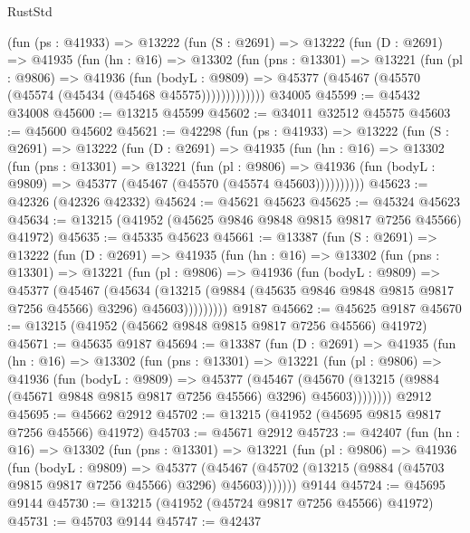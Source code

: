 \begin{lexlean}{RustStd}
\begin{coremodule}
      (fun (ps : @41933) =>
      @13222
        (fun (S : @2691) =>
        @13222
          (fun (D : @2691) =>
          @41935
            (fun (hn : @16) =>
            @13302
              (fun (pns : @13301) =>
              @13221
                (fun (pl : @9806) =>
                @41936
                  (fun (bodyL : @9809) =>
                  @45377 (@45467 (@45570 (@45574 (@45434 (@45468 @45575)))))))))))))
    @34005
@45599 := @45432 @34008
@45600 := @13215 @45599
@45602 := @34011 @32512 @45575
@45603 := @45600 @45602
@45621 := @42298
    (fun (ps : @41933) =>
    @13222
      (fun (S : @2691) =>
      @13222
        (fun (D : @2691) =>
        @41935
          (fun (hn : @16) =>
          @13302
            (fun (pns : @13301) =>
            @13221
              (fun (pl : @9806) =>
              @41936 (fun (bodyL : @9809) => @45377 (@45467 (@45570 (@45574 @45603))))))))))
@45623 := @42326 (@42326 @42332)
@45624 := @45621 @45623
@45625 := @45324 @45623
@45634 := @13215 (@41952 (@45625 @9846 @9848 @9815 @9817 @7256 @45566) @41972)
@45635 := @45335 @45623
@45661 := @13387
    (fun (S : @2691) =>
    @13222
      (fun (D : @2691) =>
      @41935
        (fun (hn : @16) =>
        @13302
          (fun (pns : @13301) =>
          @13221
            (fun (pl : @9806) =>
            @41936
              (fun (bodyL : @9809) =>
              @45377
                (@45467
                  (@45634
                    (@13215
                      (@9884 (@45635 @9846 @9848 @9815 @9817 @7256 @45566) @3296)
                      @45603)))))))))
    @9187
@45662 := @45625 @9187
@45670 := @13215 (@41952 (@45662 @9848 @9815 @9817 @7256 @45566) @41972)
@45671 := @45635 @9187
@45694 := @13387
    (fun (D : @2691) =>
    @41935
      (fun (hn : @16) =>
      @13302
        (fun (pns : @13301) =>
        @13221
          (fun (pl : @9806) =>
          @41936
            (fun (bodyL : @9809) =>
            @45377
              (@45467
                (@45670 (@13215 (@9884 (@45671 @9848 @9815 @9817 @7256 @45566) @3296) @45603))))))))
    @2912
@45695 := @45662 @2912
@45702 := @13215 (@41952 (@45695 @9815 @9817 @7256 @45566) @41972)
@45703 := @45671 @2912
@45723 := @42407
    (fun (hn : @16) =>
    @13302
      (fun (pns : @13301) =>
      @13221
        (fun (pl : @9806) =>
        @41936
          (fun (bodyL : @9809) =>
          @45377
            (@45467 (@45702 (@13215 (@9884 (@45703 @9815 @9817 @7256 @45566) @3296) @45603)))))))
    @9144
@45724 := @45695 @9144
@45730 := @13215 (@41952 (@45724 @9817 @7256 @45566) @41972)
@45731 := @45703 @9144
@45747 := @42437

\end{coremodule}
\end{lexlean}
